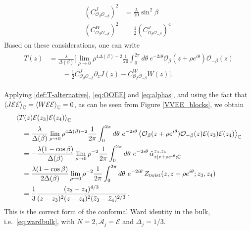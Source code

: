 \documentclass[a4paper,11pt]{article}
\begin{document}
\begin{align}
\begin{split} \label{eq:threepcoeffs}
    \left( C_{\mathcal{O}_\beta \mathcal{O}_{-\beta }}^J \right)^2 &= \frac{\lambda}{10} \sin^2\beta \\
    \left( C_{\mathcal{O}_\beta \mathcal{O}_{-\beta }}^W \right)^2 &= \frac{1}{2} \left( C_{\mathcal{O}_\beta \mathcal{O}_{-\beta }}^J \right)^4.
\end{split}
\end{align}
Based on these considerations, one can write
\begin{align}
\begin{split} \label{def:T-alternative}
    T(z) & = \frac{\lambda}{\Delta(\beta)} \bigg[ \lim_{\rho \to 0} \rho^{4\Delta(\beta)-2}
    \frac{1}{2\pi} \int_0^{2\pi} d \theta ~ e^{-2i \theta}
    \mathcal{O}_\beta(z+\rho e^{i \theta}) \mathcal{O}_{-\beta}(z) \\
    & \qquad - \frac{1}{2} C_{\mathcal{O}_\beta \mathcal{O}_{-\beta}}^J \partial_z J(z) - C_{\mathcal{O}_\beta \mathcal{O}_{-\beta}}^W W(z)
    \bigg].
\end{split}
\end{align}

Applying \eqref{def:T-alternative}, \eqref{eq:OOEE} and \eqref{eq:alphas}, and using the fact that $\braket{J \mathcal{E} \mathcal{E}}_{\mathbb{C}} = \braket{ W \mathcal{E} \mathcal{E}}_{\mathbb{C}} = 0$, as can be seen from Figure \ref{VVEE_blocks}, we obtain
\begin{align}
\begin{split} \label{eq:calculation}
    &\Braket{T(z) {\mathcal E}(z_3) {\mathcal E}(z_4)}_{\mathbb{C}} \\
    & \quad = \frac{\lambda}{\Delta(\beta)}
    \lim_{\rho \to 0} \rho^{4\Delta(\beta)-2}
    \frac{1}{2\pi} \int_{0}^{2\pi} d \theta ~ e^{-2i \theta}
    \Braket{\mathcal{O}_{\beta}(z+\rho e^{i \theta}) \mathcal{O}_{-\beta}(z) {\mathcal E}(z_3) {\mathcal E}(z_4)}_{\mathbb{C}} \\
    & \quad = - \frac{\lambda(1-\cos\beta)}{\Delta(\beta)}
    \lim_{\rho \to 0} \rho^{-2}
    \frac{1}{2\pi} \int_{0}^{2\pi} d \theta ~ e^{-2i \theta} \,  \hat\alpha^{z_3,z_4}_{z|z+\rho e^{i\theta};\mathbb{C}} \\
    & \quad = \frac{\lambda(1-\cos\beta)}{2\Delta(\beta)}
    \lim_{\rho \to 0} \rho^{-2}
    \frac{1}{2\pi} \int_{0}^{2\pi} d \theta ~ e^{-2i \theta} \, Z_{\text{twist}}(z,z+\rho e^{i\theta};z_3,z_4) \\
    & \quad =  \frac{1}{3} \frac{(z_3-z_4)^{4/3}}{(z-z_3)^2 (z-z_4)^2 (\bar{z}_3-\bar{z}_4)^{2/3}} \, .
\end{split}
\end{align}
This is the correct form of the conformal Ward identity in the bulk, i.e.\ \eqref{eq:wardbulk}, with $N=2, \mathcal{A}_j = \mathcal{E}$ and $\Delta_j = 1/3$.
\end{document}
